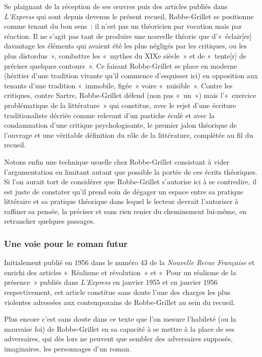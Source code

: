 \documentclass[12pt, a4paper]{article}
\begin{document}
Se plaignant de la réception de ses œuvres puis des articles publiés dans \textit{L'Express} qui sont depuis devenus le présent recueil, Robbe-Grillet se positionne comme tenant du bon sens~: il n'est pas un théoricien par vocation mais par réaction. Il ne s'agit pas tant de produire une nouvelle théorie que d'«~éclair[er] davantage les éléments qui avaient été les plus négligés par les critiques, ou les plus distordus~», combattre les «~mythes du XIXe siècle~» et de «~tente[r] de préciser quelques contours~». Ce faisant Robbe-Grillet se place en moderne (héritier d'une tradition vivante qu'il commence d'esquisser ici) en opposition aux tenants d'une tradition «~immobile, figée~» voire «~nuisible~». Contre les critiques, contre Sartre, Robbe-Grillet défend (non pas «~un~») mais l'«~exercice problématique de la littérature~» qui constitue, avec le rejet d'une écriture traditionaliste décriée comme relevant d'un pastiche éculé et avec la condamnation d'une critique psychologisante, le premier jalon théorique de l'ouvrage et une véritable définition du rôle de la littérature, complétée au fil du recueil.

Notons enfin une technique usuelle chez Robbe-Grillet consistant à vider l'argumentation en limitant autant que possible la portée de ces écrits théoriques. Si l'on aurait tort de considérer que Robbe-Grillet s'autorise ici à se contredire, il est juste de constater qu'il prend soin de dégager un espace entre sa pratique littéraire et sa pratique théorique dans lequel le lecteur devrait l'autoriser à raffiner sa pensée, la préciser et sans rien renier du cheminement lui-même, en retrancher quelques passages.


\subsubsection{Une voie pour le roman futur}
Initialement publié en 1956 dans le numéro 43 de la\textit{ Nouvelle Revue Française} et enrichi des articles «~Réalisme et révolution~» et «~Pour un réalisme de la présence~» publiés dans \textit{L'Express} en janvier 1955 et en janvier 1956 respectivement, cet article constitue sans doute l'une des charges les plus violentes adressées aux contemporains de Robbe-Grillet au sein du recueil.

Plus encore c'est sans doute dans ce texte que l'on mesure l'habileté (ou la mauvaise foi) de Robbe-Grillet en sa capacité à se mettre à la place de ses adversaires, qui dès lors ne peuvent que sembler des adversaires supposés, imaginaires, les personnages d'un roman.
\end{document}

